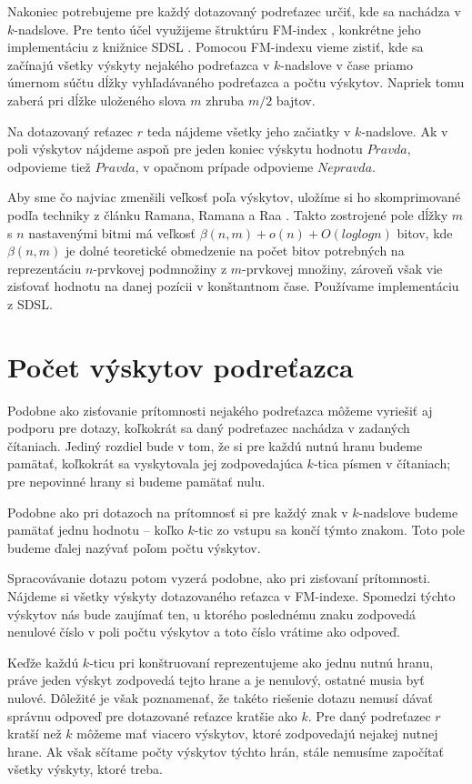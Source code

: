 Nakoniec potrebujeme pre každý dotazovaný podreťazec určiť, kde sa nachádza v $k$-nadslove.
Pre tento účel využijeme štruktúru FM-index \cite{fm_index}, konkrétne jeho implementáciu
z knižnice SDSL \cite{sdsl}. Pomocou FM-indexu vieme zistiť, kde sa začínajú všetky
výskyty nejakého podreťazca v $k$-nadslove v čase priamo úmernom súčtu dĺžky vyhľadávaného podreťazca
a počtu výskytov. Napriek tomu zaberá pri dĺžke uloženého slova $m$ zhruba $m/2$
bajtov.

Na dotazovaný reťazec $r$ teda nájdeme všetky jeho začiatky v $k$-nadslove. Ak
v poli výskytov nájdeme aspoň pre jeden koniec výskytu hodnotu $Pravda$, odpovieme
tiež $Pravda$, v opačnom prípade odpovieme $Nepravda$.

Aby sme čo najviac zmenšili veľkosť poľa výskytov, uložíme si ho skomprimované
podľa techniky z článku Ramana, Ramana a Raa \cite{rrr_vector}. Takto zostrojené pole
dĺžky $m$ s $n$ nastavenými bitmi má veľkosť $\beta(n, m) + o(n) + O(log log n)$ bitov,
kde $\beta(n, m)$ je dolné teoretické obmedzenie na počet bitov potrebných na reprezentáciu
$n$-prvkovej podmnožiny z $m$-prvkovej množiny, zároveň však vie zisťovať hodnotu na danej
pozícii v konštantnom čase. Používame implementáciu z SDSL.

\section{Počet výskytov podreťazca}
\label{sekcia:index_pocet}

Podobne ako zisťovanie prítomnosti nejakého podreťazca môžeme vyriešiť aj podporu
pre dotazy, koľkokrát sa daný podreťazec nachádza v zadaných čítaniach. Jediný rozdiel
bude v tom, že si pre každú nutnú hranu budeme pamätať, koľkokrát sa vyskytovala jej
zodpovedajúca $k$-tica písmen v čítaniach; pre nepovinné hrany si budeme pamätať nulu.

Podobne ako pri dotazoch na prítomnosť si pre každý znak v $k$-nadslove
budeme pamätať jednu hodnotu -- koľko $k$-tic zo vstupu sa končí týmto znakom. Toto
pole budeme ďalej nazývať poľom počtu výskytov.

Spracovávanie dotazu potom vyzerá podobne, ako pri zisťovaní prítomnosti. Nájdeme
si všetky výskyty dotazovaného reťazca v FM-indexe. Spomedzi týchto výskytov nás
bude zaujímať ten, u ktorého poslednému znaku zodpovedá nenulové číslo
v poli počtu výskytov a toto číslo vrátime ako odpoveď. 

Keďže každú $k$-ticu pri konštruovaní
reprezentujeme ako jednu nutnú hranu, práve jeden výskyt zodpovedá tejto hrane a
je nenulový, ostatné musia byť nulové. Dôležité je však poznamenať, že takéto
riešenie dotazu nemusí dávať správnu odpoveď pre dotazované reťazce kratšie ako $k$.
Pre daný podreťazec $r$ kratší než $k$ môžeme mať viacero výskytov, ktoré zodpovedajú
nejakej nutnej hrane. Ak však sčítame počty výskytov týchto hrán, stále nemusíme
započítať všetky výskyty, ktoré treba.

